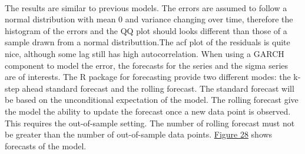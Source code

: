 \documentclass[12pt]{article}
\begin{document}
\paragraph{}
The results are similar to previous models. The errors are assumed to follow a normal distribution with mean 0 and variance changing over time, therefore the histogram of the errors and the QQ plot should looks different than those of a sample drawn from a normal distributtion.The acf plot of the residuals is quite nice, although some lag still has high autocorrelation. When using a GARCH component to model the error, the forecasts for the series and the sigma series are of interests. The R package for forecasting provide two different modes: the k-step ahead standard forecast and the rolling forecast. The standard forecast will be based on the unconditional expectation of the model. The rolling forecast give the model the ability to update the forecast once a new data point is observed. This requires the out-of-sample setting. The number of rolling forecast must not be greater than the number of out-of-sample data points. \href{figure28}{Figure 28} shows forecasts of the model.
\end{document}
